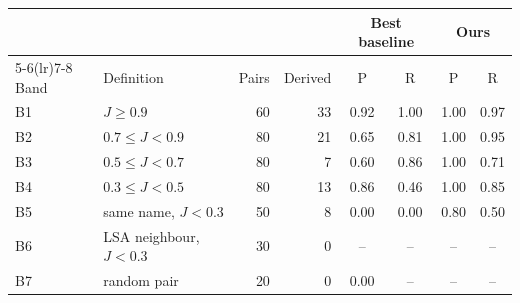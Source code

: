 \begin{tabular}{llrrcccc}
\toprule
 & & & & \multicolumn{2}{c}{Best baseline} & \multicolumn{2}{c}{Ours} \\
\cmidrule(lr){5-6}\cmidrule(lr){7-8}
Band & Definition & Pairs & Derived & P & R & P & R \\
\midrule
B1 & $J \geq 0.9$ & 60 & 33 & 0.92 & 1.00 & 1.00 & 0.97 \\
B2 & $0.7 \leq J < 0.9$ & 80 & 21 & 0.65 & 0.81 & 1.00 & 0.95 \\
B3 & $0.5 \leq J < 0.7$ & 80 & 7 & 0.60 & 0.86 & 1.00 & 0.71 \\
B4 & $0.3 \leq J < 0.5$ & 80 & 13 & 0.86 & 0.46 & 1.00 & 0.85 \\
B5 & same name, $J<0.3$ & 50 & 8 & 0.00 & 0.00 & 0.80 & 0.50 \\
B6 & LSA neighbour, $J<0.3$ & 30 & 0 & -- & -- & -- & -- \\
B7 & random pair & 20 & 0 & 0.00 & -- & -- & -- \\
\bottomrule
\end{tabular}
